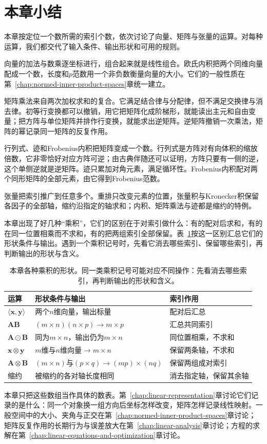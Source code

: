 
\section{本章小结}
\label{sec:ls-operations-summary}

本章按定位一个数所需的索引个数，依次讨论了向量、矩阵与张量的运算。对每种运算，我们都交代了输入条件、输出形状和可用的规则。

向量的加法与数乘逐坐标进行，组合起来就是线性组合。欧氏内积把两个同维向量配成一个数，长度和$p$范数用一个非负数衡量向量的大小。它们的一般性质在第~\ref{chap:normed-inner-product-spaces}章统一建立。

矩阵乘法来自两次加权求和的复合。它满足结合律与分配律，但不满足交换律与消去律。初等行变换都可以撤销，用它把矩阵化成阶梯形，就能读出主元和自由变量；把方阵与单位矩阵并排作行变换，就能求出逆矩阵。逆矩阵撤销一次乘法，矩阵的幂记录同一矩阵的反复作用。

行列式、迹和Frobenius内积把矩阵变成一个数。行列式是方阵对有向体积的缩放倍数，它非零恰好对应方阵可逆；由古典伴随还可以证明，方阵只要有一侧的逆，这个单侧逆就是逆矩阵。迹只累加对角元素，满足循环性。Frobenius内积配对两个同形矩阵的全部元素，由它得到Frobenius范数。

张量把索引推广到任意多个。重排只改变元素的位置，张量积与Kronecker积保留各因子的全部轴，缩约沿指定的轴求和；内积、矩阵乘法与迹都是缩约的特例。

本章出现了好几种“乘积”，它们的区别在于对索引做什么：有的配对后求和，有的在同一位置相乘而不求和，有的把两组索引全部保留。表~\ref{tab:linear-algebra-products-and-shapes}按这一区别汇总它们的形状条件与输出。遇到一个乘积记号时，先看它消去哪些索引、保留哪些索引，再判断输出的形状与含义。

\begin{table}[htbp]
 \centering\small
 \begin{tabularx}{\linewidth}{@{}lXX@{}}
  \toprule
  运算 & 形状条件与输出 & 索引作用\\
  \midrule
  $\langle\bm x,\bm y\rangle$ & 两个$n$维向量，输出标量 & 配对后汇总\\
  $\bm A\bm B$ & $(m\times n)(n\times p)\to m\times p$ & 汇总共同索引\\
  $\bm A\odot\bm B$ & 同为$m\times n$，输出仍为$m\times n$ & 同位置相乘，不求和\\
  $\bm x\otimes\bm y$ & $m$维与$n$维向量$\to m\times n$ & 保留两条轴，不求和\\
  $\bm A\otimes\bm B$ & $(m\times n)$与$(p\times q)\to(mp)\times(nq)$ & 保留两组成对索引\\
  缩约 & 被缩约的各对轴长度相同 & 消去指定轴，保留其余轴\\
  \bottomrule
 \end{tabularx}
 \caption{本章各种乘积的形状。同一类乘积记号可能对应不同操作：先看消去哪些索引，再判断输出的形状和含义。}
 \label{tab:linear-algebra-products-and-shapes}
\end{table}

本章只把这些数组当作具体的数表。第~\ref{chap:linear-representation}章讨论它们记录的是什么：同一个对象换一组方向后坐标怎样改变，矩阵怎样记录线性映射。一般空间中的大小、夹角与正交在第~\ref{chap:normed-inner-product-spaces}章讨论；矩阵反复作用的长期行为与误差放大在第~\ref{chap:linear-analysis}章讨论；方程的求解在第~\ref{chap:linear-equations-and-optimization}章讨论。
